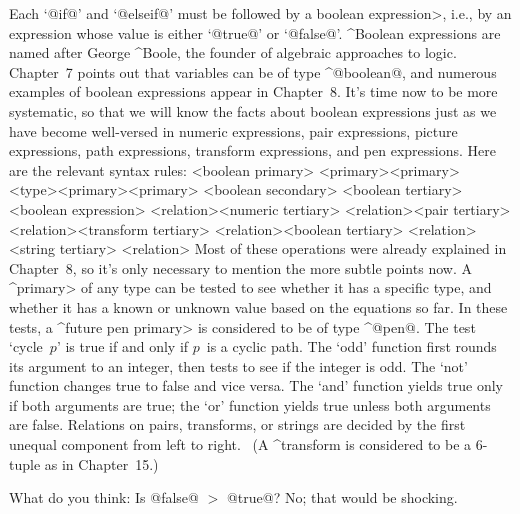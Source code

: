 \danger Each `@if@\kern1pt' and `@elseif@\kern1pt' must be followed by a
\<boolean expression>, i.e., by an expression whose value is either
`@true@' or `@false@'. ^{Boolean expressions} are named after George
^{Boole}, the founder of algebraic approaches to logic. Chapter~7 points
out that variables can be of type ^@boolean@, and numerous examples of
boolean expressions appear in Chapter~8. It's time now to be more
systematic, so that we will know the facts about boolean expressions just
as we have become well-versed in numeric expressions, pair expressions,
picture expressions, path expressions, transform expressions, and pen
expressions. Here are the relevant syntax rules:
\beginsyntax
<boolean primary>
 \alt[true]\alt[false]
 \alt[known]<primary>\alt[unknown]<primary>
 \alt<type><primary>\alt[cycle]<primary>
<boolean secondary>
<boolean tertiary>
<boolean expression>
 <relation><numeric tertiary>
 <relation><pair tertiary>
 <relation><transform tertiary>
 <relation><boolean tertiary>
 <relation><string tertiary>
<relation>\is[\char'74]\alt[\char'74=]\alt[>]\alt[>=]\alt[=]\alt[\char'74>]
\endsyntax
Most of these operations were already explained in Chapter~8, so it's only
necessary to mention the more subtle points now. A ^\<primary> of any
type can be tested to see whether it has a specific type, and whether it
has a known or unknown value based on the equations so far. In these tests,
a ^\<future pen primary> is considered to be of type ^@pen@. The test
`cycle~$p$' is true if and only if $p$~is a cyclic path. The `odd' function
first rounds its argument to an integer, then tests to see if the integer
is odd.  The `not' function changes true to false and vice versa. The `and'
function yields true only if both arguments are true; the `or' function
yields true unless both arguments are false. Relations on pairs, transforms,
or strings are decided by the first unequal component from left to right.
\ (A ^{transform} is considered to be a 6-tuple as in Chapter~15.) \

\dangerexercise What do you think: Is @false@ $>$ @true@?
\answer No; that would be shocking.

